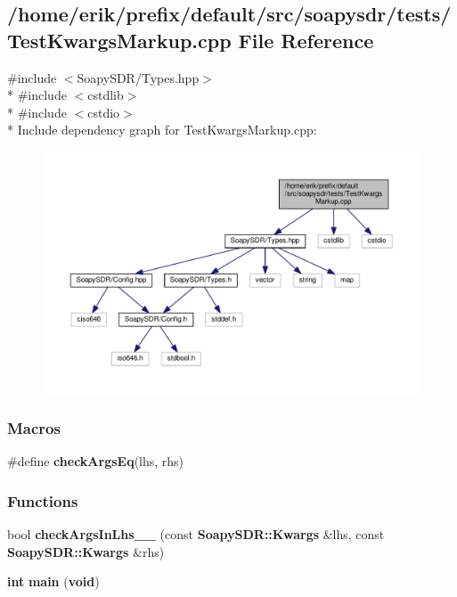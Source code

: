 \subsection{/home/erik/prefix/default/src/soapysdr/tests/\+Test\+Kwargs\+Markup.cpp File Reference}
\label{TestKwargsMarkup_8cpp}
{\ttfamily \#include $<$Soapy\+S\+D\+R/\+Types.\+hpp$>$}\\*
{\ttfamily \#include $<$cstdlib$>$}\\*
{\ttfamily \#include $<$cstdio$>$}\\*
Include dependency graph for Test\+Kwargs\+Markup.\+cpp\+:
\nopagebreak
\begin{figure}[H]
\begin{center}
\leavevmode
\includegraphics[width=350pt]{db/d25/TestKwargsMarkup_8cpp__incl}
\end{center}
\end{figure}
\subsubsection*{Macros}
\begin{DoxyCompactItemize}
\item 
\#define {\bf check\+Args\+Eq}(lhs,  rhs)
\end{DoxyCompactItemize}
\subsubsection*{Functions}
\begin{DoxyCompactItemize}
\item 
bool {\bf check\+Args\+In\+Lhs\+\_\+\+\_\+} (const {\bf Soapy\+S\+D\+R\+::\+Kwargs} \&lhs, const {\bf Soapy\+S\+D\+R\+::\+Kwargs} \&rhs)
\item 
{\bf int} {\bf main} ({\bf void})
\end{DoxyCompactItemize}


